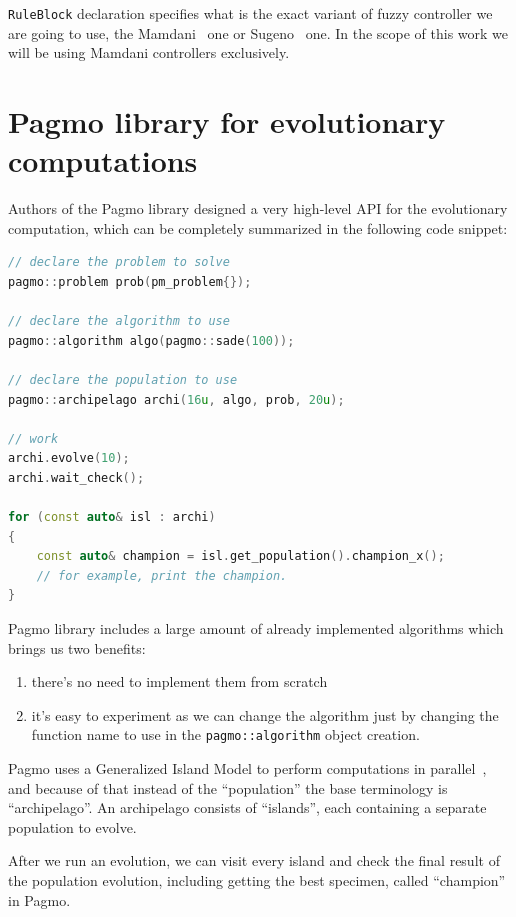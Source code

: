 \documentclass[12pt, a4paper]{report}
\begin{document}
	
  \texttt{RuleBlock} declaration specifies what is the exact variant of fuzzy controller we are going to use, the Mamdani~\cite{fuzzy::Mamdani} one or Sugeno~\cite{fuzzy::Sugeno} one.
  In the scope of this work we will be using Mamdani controllers exclusively.

	\section{Pagmo library for evolutionary computations}

	Authors of the Pagmo library designed a very high-level API for the evolutionary computation, which can be completely summarized in the following code snippet:
	
	\begin{lstlisting}[language=c++]
// declare the problem to solve
pagmo::problem prob(pm_problem{});

// declare the algorithm to use
pagmo::algorithm algo(pagmo::sade(100));

// declare the population to use
pagmo::archipelago archi(16u, algo, prob, 20u);

// work
archi.evolve(10);
archi.wait_check();

for (const auto& isl : archi)
{
	const auto& champion = isl.get_population().champion_x();
	// for example, print the champion.
}
	\end{lstlisting}

	Pagmo library includes a large amount of already implemented algorithms which brings us two benefits:
	
	\begin{enumerate}
		\item there's no need to implement them from scratch
		\item it's easy to experiment as we can change the algorithm just by changing the function name to use in the \texttt{pagmo::algorithm} object creation.
	\end{enumerate}
	
	Pagmo uses a Generalized Island Model to perform computations in parallel~\cite{Izzo2012}, and because of that instead of the ``population'' the base terminology is ``archipelago''.
	An archipelago consists of ``islands'', each containing a separate population to evolve.
	
	After we run an evolution, we can visit every island and check the final result of the population evolution, including getting the best specimen, called ``champion'' in Pagmo.
	
\end{document}
